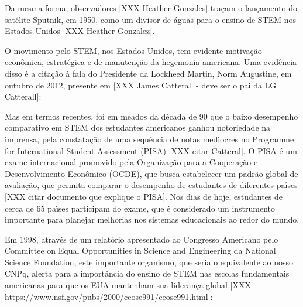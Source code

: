 \documentclass[
12pt,		%
openright,	%
twoside,  %
a4paper,			%
chapter=TITLE,		%
english,			%
french,				%
spanish,			%
brazil				%
]{USPSC-classe/USPSC_RedarTex}
\begin{document}
Da mesma forma, observadores [XXX Heather Gonzales] tra\c{c}am o lan\c{c}amento do sat\'elite Sputnik, em 1950, como um divisor de \'aguas para o ensino de STEM nos Estados Unidos [XXX Heather Gonzalez].








O movimento pelo STEM, nos Estados Unidos, tem evidente motiva\c{c}\~ao econ\^omica, estrat\'egica e de manuten\c{c}\~ao da hegemonia americana. Uma evid\^encia disso \'e a cita\c{c}\~ao \`a fala do Presidente da Lockheed Martin, Norm Augustine, em outubro de 2012, presente em [XXX James Catterall - deve ser o pai da LG Catterall]:









\noindent\begin{center}\mbox{\centering{}}\end{center}


Mas em termos recentes, foi em meados da d\'ecada de 90 que o baixo desempenho comparativo em STEM dos estudantes americanos ganhou notoriedade na imprensa, pela constata\c{c}\~ao de uma sequ\^encia de notas med\'{\i}ocres no Programme for International Student Assessment (PISA) [XXX citar Catteral]. O PISA \'e um exame internacional promovido pela Organiza\c{c}\~ao para a Coopera\c{c}\~ao e Desenvolvimento Econ\^omico (OCDE), que busca estabelecer um padr\~ao global de avalia\c{c}\~ao, que permita comparar o desempenho de estudantes de diferentes pa\'{\i}ses [XXX citar documento que explique o PISA]. Nos dias de hoje, estudantes de cerca de 65 pa\'{\i}ses participam do exame, que \'e considerado um instrumento importante para planejar melhorias nos sistemas educacionais ao redor do mundo.








Em 1998, atrav\'es de um relat\'orio apresentado ao Congresso Americano pelo Committee on Equal Opportunities in Science and Engineering da National Science Foundation, este importante organismo, que seria o equivalente ao nosso CNPq, alerta para a import\^ancia do ensino de STEM nas escolas fundamentais americanas para que os EUA mantenham sua lideran\c{c}a global [XXX https://www.nsf.gov/pubs/2000/ceose991/ceose991.html]:
\end{document}

